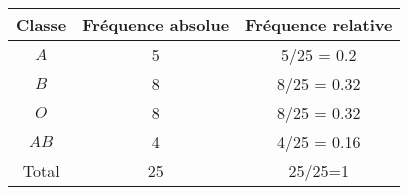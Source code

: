 \documentclass{standalone}
\begin{document}
  

	\begin{tabular}{ccc}
		\hline
		Classe & Fréquence absolue & Fréquence relative\\
		\hline
		$A$ &5 & 5/25 = 0.2		\\
		$B$ & 8 & 8/25 = 0.32	\\
		$O$ & 8 & 8/25 = 0.32	\\
		$AB$ & 4 & 4/25 = 0.16	\\
		\hline
		Total & 25 & 25/25=1	\\
		\hline
	\end{tabular}
\end{document}
